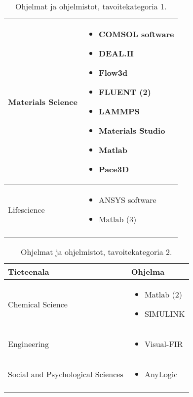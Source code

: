 \documentclass[utf8]{gradu3}
\begin{document}
\begin{longtable}[h]{|p{5cm}|p{8cm}|}
    \hline
    Materials Science & \begin{itemize}
        \item COMSOL software 
        \item DEAL.II
        \item Flow3d
        \item FLUENT (2)
        \item LAMMPS
        \item Materials Studio
        \item Matlab
        \item Pace3D 
    \end{itemize} \\
    \hline
    Lifescience & \begin{itemize}
        \item ANSYS software
        \item Matlab (3)
    \end{itemize} \\
    \hline
    \caption{Ohjelmat ja ohjelmistot, tavoitekategoria 1.}
    \label{table:ohjelmistot 1.}
\end{longtable}

\pagebreak

\begin{longtable}[h]{|p{5cm}|p{8cm}|}
    \hline
    \textbf{Tieteenala}    &    \textbf{Ohjelma}\\
    \hline
    Chemical Science & \begin{itemize}
        \item Matlab (2)
        \item SIMULINK
    \end{itemize} \\
    \hline
    Engineering & \begin{itemize}
        \item Visual-FIR
    \end{itemize} \\
    \hline
    Social and Psychological Sciences & \begin{itemize}
        \item AnyLogic
    \end{itemize} \\   
    \hline
    \caption{Ohjelmat ja ohjelmistot, tavoitekategoria 2.}
    \label{table:ohjelmistot 2.}
\end{longtable}
\end{document}
